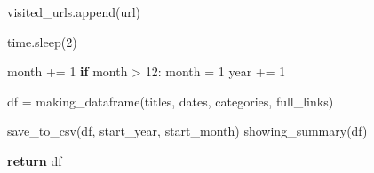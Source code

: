 \documentclass[
  letterpaper,
  DIV=11,
  numbers=noendperiod]{scrartcl}
\newenvironment{Shaded}{\begin{snugshade}}{\end{snugshade}}
\newcommand{\ControlFlowTok}[1]{\textcolor[rgb]{0.00,0.23,0.31}{\textbf{#1}}}
\newcommand{\DecValTok}[1]{\textcolor[rgb]{0.68,0.00,0.00}{#1}}
\newcommand{\NormalTok}[1]{\textcolor[rgb]{0.00,0.23,0.31}{#1}}
\newcommand{\OperatorTok}[1]{\textcolor[rgb]{0.37,0.37,0.37}{#1}}
\begin{document}
\begin{Shaded}
\begin{Highlighting}[]
\NormalTok{        visited\_urls.append(url)}
        
\NormalTok{        time.sleep(}\DecValTok{2}\NormalTok{)  }
        
\NormalTok{        month }\OperatorTok{+=} \DecValTok{1}
        \ControlFlowTok{if}\NormalTok{ month }\OperatorTok{\textgreater{}} \DecValTok{12}\NormalTok{:}
\NormalTok{            month }\OperatorTok{=} \DecValTok{1}
\NormalTok{            year }\OperatorTok{+=} \DecValTok{1}
    
\NormalTok{    df }\OperatorTok{=}\NormalTok{ making\_dataframe(titles, dates, categories, full\_links)}
    
\NormalTok{    save\_to\_csv(df, start\_year, start\_month)}
\NormalTok{    showing\_summary(df)}
    
    \ControlFlowTok{return}\NormalTok{ df}
\end{Highlighting}
\end{Shaded}
\end{document}
